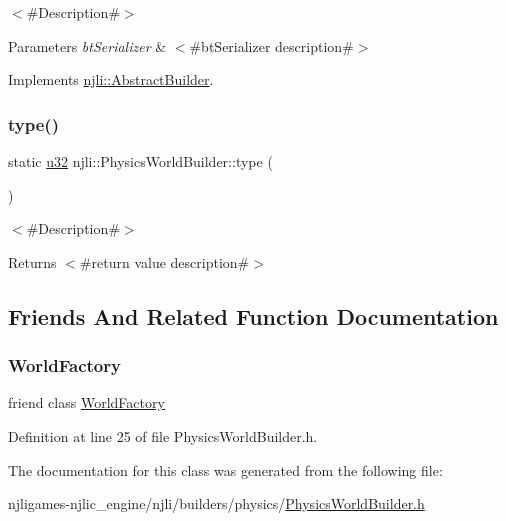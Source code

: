 $<$\#\+Description\#$>$


\begin{DoxyParams}{Parameters}
{\em bt\+Serializer} & $<$\#bt\+Serializer description\#$>$ \\
\hline
\end{DoxyParams}


Implements \mbox{\hyperlink{classnjli_1_1_abstract_builder_ab66b774e02ccb9da554c9aab7fa6d981}{njli\+::\+Abstract\+Builder}}.

\mbox{\label{classnjli_1_1_physics_world_builder_a0ce1bd1ee43207d33c421d3d2af1ed3b}} 
\subsubsection{\texorpdfstring{type()}{type()}}
{\footnotesize\ttfamily static \mbox{\hyperlink{_util_8h_a10e94b422ef0c20dcdec20d31a1f5049}{u32}} njli\+::\+Physics\+World\+Builder\+::type (\begin{DoxyParamCaption}{ }\end{DoxyParamCaption})\hspace{0.3cm}{\ttfamily [static]}}

$<$\#\+Description\#$>$

\begin{DoxyReturn}{Returns}
$<$\#return value description\#$>$ 
\end{DoxyReturn}


\subsection{Friends And Related Function Documentation}
\mbox{\label{classnjli_1_1_physics_world_builder_acb96ebb09abe8f2a37a915a842babfac}} 
\subsubsection{\texorpdfstring{World\+Factory}{WorldFactory}}
{\footnotesize\ttfamily friend class \mbox{\hyperlink{classnjli_1_1_world_factory}{World\+Factory}}\hspace{0.3cm}{\ttfamily [friend]}}



Definition at line 25 of file Physics\+World\+Builder.\+h.



The documentation for this class was generated from the following file\+:\begin{DoxyCompactItemize}
\item 
njligames-\/njlic\+\_\+engine/njli/builders/physics/\mbox{\hyperlink{_physics_world_builder_8h}{Physics\+World\+Builder.\+h}}\end{DoxyCompactItemize}
